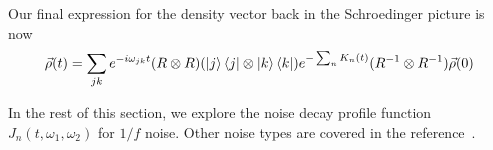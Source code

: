 Our final expression for the density vector back in the Schroedinger picture is now
\begin{equation}
    \vec{\rho}(t) = \sum_{jk}e^{-i\omega_{jk}t}(R\otimes R)(\ket{j}\bra{j}\otimes\ket{k}\bra{k})e^{-\sum_nK_n(t)}(R^{-1}\otimes R^{-1})\vec{\rho}(0)
\end{equation}

In the rest of this section, we explore the noise decay profile function $J_n(t,\omega_1,\omega_2)$ for $1/f$ noise. Other noise types are covered in the reference~\cite{yang_2019}.